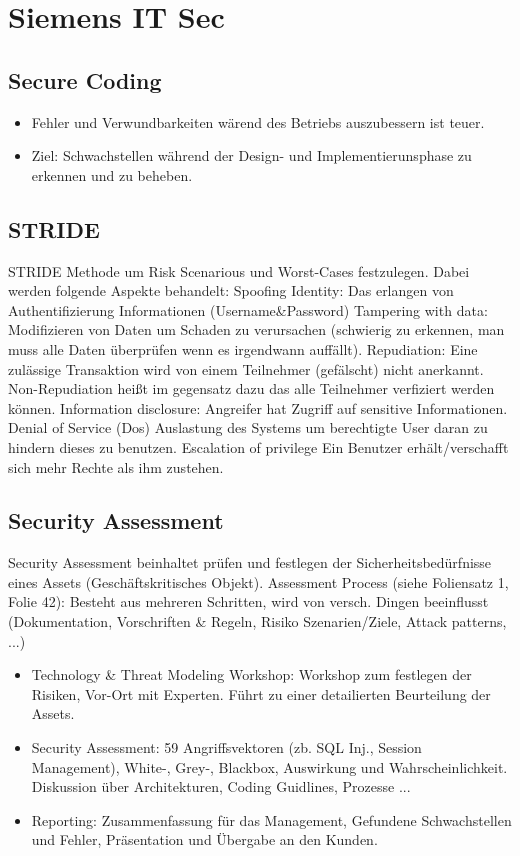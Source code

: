 \documentclass[a4paper, 12pt]{article}
\begin{document}
\section{Siemens IT Sec}
\subsection{Secure Coding}
	\begin{itemize}
		\item Fehler und Verwundbarkeiten wärend des Betriebs auszubessern ist teuer.
		\item Ziel: Schwachstellen während der Design- und Implementierunsphase zu erkennen und zu beheben.
	\end{itemize}
\subsection{STRIDE}
	STRIDE Methode um Risk Scenarious und Worst-Cases festzulegen. Dabei werden folgende Aspekte behandelt:
	\large Spoofing Identity:
	Das erlangen von Authentifizierung Informationen (Username&Password)
	\large Tampering with data:
	Modifizieren von Daten um Schaden zu verursachen (schwierig zu erkennen, man muss alle Daten überprüfen wenn es irgendwann auffällt).
	\large Repudiation:
	Eine zulässige Transaktion wird von einem Teilnehmer (gefälscht) nicht anerkannt.
	Non-Repudiation heißt im gegensatz dazu das alle Teilnehmer verfiziert werden können.
	\large Information disclosure:
	Angreifer hat Zugriff auf sensitive Informationen.
	\large Denial of Service (Dos)
	Auslastung des Systems um berechtigte User daran zu hindern dieses zu benutzen.
	\large Escalation of privilege
	Ein Benutzer erhält/verschafft sich mehr Rechte als ihm zustehen.
\subsection{Security Assessment}
Security Assessment beinhaltet prüfen und festlegen der Sicherheitsbedürfnisse eines Assets (Geschäftskritisches Objekt).
	\large Assessment Process (siehe Foliensatz 1, Folie 42):
	Besteht aus mehreren Schritten, wird von versch. Dingen beeinflusst (Dokumentation, Vorschriften & Regeln, Risiko Szenarien/Ziele, Attack patterns, ...)
	\begin{itemize}
		\item Technology & Threat Modeling Workshop: Workshop zum festlegen der Risiken, Vor-Ort mit Experten. Führt zu einer detailierten Beurteilung der Assets.
		\item Security Assessment: 59 Angriffsvektoren (zb. SQL Inj., Session Management), White-, Grey-, Blackbox, Auswirkung und Wahrscheinlichkeit. Diskussion über Architekturen, Coding Guidlines, Prozesse ...
		\item Reporting: Zusammenfassung für das Management, Gefundene Schwachstellen und Fehler, Präsentation und Übergabe an den Kunden. 
	\end{itemize}
\end{document}
